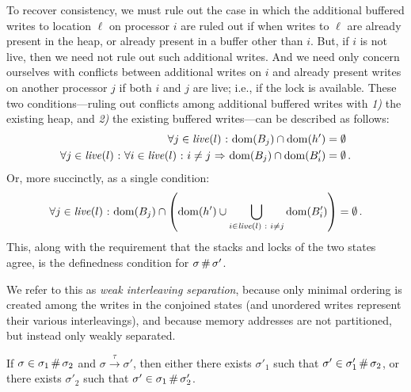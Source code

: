 \documentclass[11pt]{article}
\begin{document}
To recover consistency, we must rule out the case in which the additional buffered writes to location $\ell$ on processor $i$ are ruled out if when writes to $\ell$ are already present in the heap, or already present in a buffer other than $i$. But, if $i$ is not live, then we need not rule out such additional writes. And we need only concern ourselves with conflicts between additional writes on $i$ and already present writes on another processor $j$ if both $i$ and $j$ are live; i.e., if the lock is available. These two conditions---ruling out conflicts among additional buffered writes with \emph{1)} the existing heap, and \emph{2)} the existing buffered writes---can be described as follows: \begin{align*}
	\forall j \in  \mathit{live}(l) \operatorname{\,:\,} \operatorname{\mathrm{dom}}(B_j) \cap \operatorname{\mathrm{dom}}(h') & = \operatorname{\emptyset} \\
	\forall j \in  \mathit{live}(l) \operatorname{\,:\,} \forall i \in \mathit{live}(l) \operatorname{\,:\,} i \neq j \operatorname{\,\Rightarrow\,} \operatorname{\mathrm{dom}}(B_j) \cap \operatorname{\mathrm{dom}}(B'_i) & = \operatorname{\emptyset}. \\
\end{align*} Or, more succinctly, as a single condition: \[ \forall j \in \mathit{live}(l) \operatorname{\,:\,} \operatorname{\mathrm{dom}}(B_j) \cap \left( \operatorname{\mathrm{dom}}(h') \cup \bigcup_{i \in \mathit{live}(l) \operatorname{\,:\,} i \neq j} \operatorname{\mathrm{dom}}(B'_i)\right) = \operatorname{\emptyset}. \] 
This, along with the requirement that the stacks and locks of the two states agree, is the definedness condition for $\sigma \operatorname{\#} \sigma'$.

We refer to this as \emph{weak interleaving separation}, because only minimal ordering is created among the writes in the conjoined states (and unordered writes represent their various interleavings), and because memory addresses are not partitioned, but instead only weakly separated. 

\begin{lemma}
	\label{lem:separation-tau}
	If $\sigma \in \sigma_1 \operatorname{\#} \sigma_2$ and $\sigma \stackrel{\tau}{\rightarrow} \sigma'$, then either there exists $\sigma'_1$ such that $\sigma' \in \sigma'_1 \operatorname{\#} \sigma_2$, or there exists $\sigma'_2$ such that $\sigma' \in \sigma_1 \operatorname{\#} \sigma'_2$.
\end{lemma}
\end{document}
